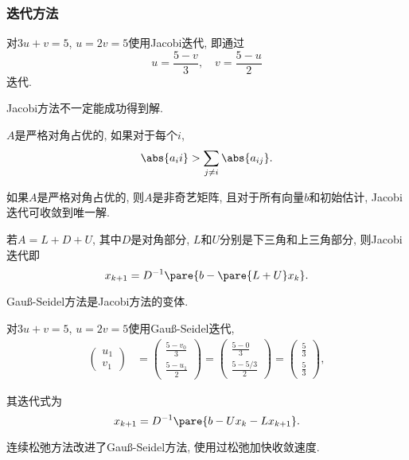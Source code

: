 \documentclass{ctexart}
\begin{document}

\subsubsection{迭代方法} %
\label{ssub:迭代方法}

\begin{ex}
    对$3u+v=5$, $u=2v=5$使用Jacobi迭代, 即通过
    \[ u = \frac{5-v}{3},\quad v = \frac{5-u}{2} \]
    迭代.
\end{ex}
Jacobi方法不一定能成功得到解.
\begin{definition}
    $A$是严格对角占优的, 如果对于每个$i$,
    \[ \abs{a_ii} > \sum_{j\neq i} \abs{a_{ij}}. \]
\end{definition}
\begin{theorem}
    如果$A$是严格对角占优的, 则$A$是非奇艺矩阵, 且对于所有向量$b$和初始估计, Jacobi迭代可收敛到唯一解.
\end{theorem}
若$A=L+D+U$, 其中$D$是对角部分, $L$和$U$分别是下三角和上三角部分, 则Jacobi迭代即
\[ x_{k+1} = D^{-1} \pare{b-\pare{L+U}x_k}. \]
\par
Gau\ss-Seidel方法是Jacobi方法的变体.
\begin{ex}
    对$3u+v=5$, $u=2v=5$使用Gau\ss-Seidel迭代,
    \begin{align*}
        \begin{pmatrix}
            u_1 \\ v_1
        \end{pmatrix} &= \begin{pmatrix}
            \displaystyle \frac{5-v_0}{3} \\[1em] \displaystyle \frac{5-u_1}{2}
        \end{pmatrix} = \begin{pmatrix}
            \displaystyle \frac{5-0}{3} \\[1em] \displaystyle \frac{5-5/3}{2}
        \end{pmatrix} = \begin{pmatrix}
            \displaystyle \frac{5}{3} \\[1em] \displaystyle \frac{5}{3}
        \end{pmatrix},
    \end{align*}
\end{ex}
其迭代式为
\[ x_{k+1} = D^{-1}\pare{b-Ux_k - Lx_{k+1}}. \]
\par
连续松弛方法改进了Gau\ss-Seidel方法, 使用过松弛加快收敛速度.
\end{document}
